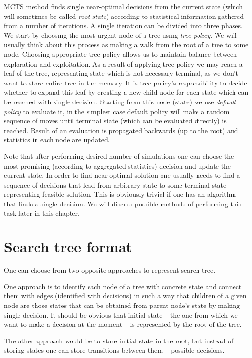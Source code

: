 MCTS method finds single near-optimal decisions from the current state (which
will sometimes be called \emph{root state}) according to statistical
information gathered from a number of iterations. A single iteration can be
divided into three phases.
We start by choosing the most urgent node of a tree using \emph{tree policy}.
We will usually think about this process as making a walk from the root of a
tree to some node. Choosing appropriate tree policy allows us to maintain
balance between exploration and exploitation.
As a result of applying tree policy we may reach a leaf of the tree,
representing state which is not necessary terminal, as we don't want to store
entire tree in the memory. It is tree policy's responsibility to decide whether
to expand this leaf by creating a new child node for each state which can be
reached with single decision.
Starting from this node (state) we use \emph{default policy} to evaluate it, in
the simplest case default policy will make a random sequence of moves until
terminal state (which can be evaluated directly) is reached.
Result of an evaluation is propagated backwards (up to the root) and statistics
in each node are updated.

Note that after performing desired number of simulations one can choose the
most promising (according to aggregated statistics) decision and update the
current state. In order to find near-optimal solution one usually needs to find
a sequence of decisions that lead from arbitrary state to some terminal state
representing feasible solution. This is obviously trivial if one has an
algorithm that finds a single decision. We will discuss possible methods of
performing this task later in this chapter.

\section{Search tree format}
One can choose from two opposite approaches to represent search tree.

One approach is to identify each node of a tree with concrete state and connect
them with edges (identified with decisions) in such a way that children of a
given node are those states that can be obtained from parent node's state by
making single decision. It should be obvious that initial state -- the one from
which we want to make a decision at the moment -- is represented by the root of
the tree.

The other approach would be to store initial state in the root, but instead of
storing states one can store transitions between them -- possible decisions.

